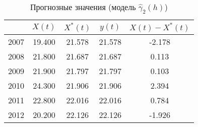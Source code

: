 \begin{table}[H]
\centering
\begin{tabular}{r|cccc}
  \hline
 & $X(t)$ & $X^{*}(t)$ & $y(t)$ & $ X(t) - X^{*}(t) $ \\ 
  \hline
2007 & 19.400 & 21.578 & 21.578 & -2.178 \\ 
  2008 & 21.800 & 21.687 & 21.687 & 0.113 \\ 
  2009 & 21.900 & 21.797 & 21.797 & 0.103 \\ 
  2010 & 24.300 & 21.906 & 21.906 & 2.394 \\ 
  2011 & 22.800 & 22.016 & 22.016 & 0.784 \\ 
  2012 & 20.200 & 22.126 & 22.126 & -1.926 \\ 
   \hline
\end{tabular}
\caption{Прогнозные значения (модель $ \widehat{\gamma}_2(h) $)} 
\label{table:lin-fit-prediction}
\end{table}
